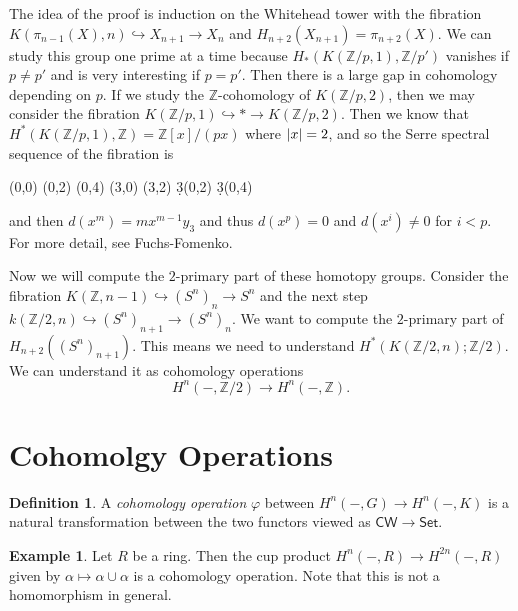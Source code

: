 \documentclass[leqno, openany]{memoir}
\theoremstyle{definition}
\newtheorem{defn}[thm]{Definition}
\newtheorem{exm}[thm]{Example}
\theoremstyle{remark}
\theoremstyle{plain}
\theoremstyle{definition}
\theoremstyle{remark}
\newcommand{\Z}{\mathbb{Z}}
\newcommand{\ms}[1]{\mathsf{#1}}
\begin{document}
The idea of the proof is induction on the Whitehead tower with the fibration $K(\pi_{n-1}(X), n) \hookrightarrow X_{n+1} \to X_n$ and $H_{n+2}(X_{n+1}) = \pi_{n+2}(X)$. We can study this group one prime at a time because $H_*(K(\Z/p, 1), \Z/p')$ vanishes if $p \neq p'$ and is very interesting if $p = p'$. Then there is a large gap in cohomology depending on $p$. If we study the $\Z$-cohomology of $K(\Z/p, 2)$, then we may consider the fibration $K(\Z/p, 1) \hookrightarrow * \to K(\Z/p, 2)$. Then we know that
$H^*(K(\Z/p, 1), \Z) = \Z[x]/(px)$ where $\abs{x} = 2$, and so the Serre spectral sequence of the fibration is
\begin{center}
    \begin{sseqdata}[name=kzp2, classes={draw=none}, cohomological Serre grading]
        \class["1"](0,0)
        \class["x"](0,2)
        \class["x^2"](0,4)
        \class["y_3"](3,0)
        \class["xy_3"](3,2)
        \d3(0,2)
        \d3(0,4)
    \end{sseqdata}
    \printpage[name=kzp2, page=3, grid=chess]
\end{center}
and then $d(x^m) = mx^{m-1} y_3$ and thus $d(x^p) = 0$ and $d(x^i) \neq 0$ for $i<p$. For more detail, see Fuchs-Fomenko.

Now we will compute the $2$-primary part of these homotopy groups. Consider the fibration $K(\Z, n-1) \hookrightarrow {(S^n)}_n \to S^n$ and the next step $k(\Z/2, n) \hookrightarrow {(S^n)}_{n+1} \to {(S^n)}_n$. We want to compute the $2$-primary part of $H_{n+2}({(S^n)}_{n+1})$. This means we need to understand $H^*(K(\Z/2, n); \Z/2)$. We can understand it as cohomology operations
\[ H^n(-, \Z/2) \to H^n(-, \Z). \]

\section{Cohomolgy Operations}%
\label{sec:cohomolgy_operations}

\begin{defn}
    A \textit{cohomology operation} $\varphi$ between $H^n(-,G) \to H^n(-,K)$ is a natural transformation between the two functors viewed as $\ms{CW} \to \ms{Set}$.
\end{defn}

\begin{exm}
    Let $R$ be a ring. Then the cup product $H^n(-,R) \to H^{2n}(-,R)$ given by $\alpha \mapsto \alpha \cup \alpha$ is a cohomology operation. Note that this is not a homomorphism in general.
\end{exm}
\end{document}
